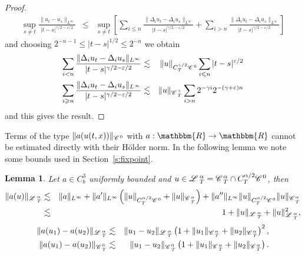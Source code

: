 \documentclass[11pt,reqno]{amsart}
\newtheorem{lemma}[theorem]{Lemma}
\newcommand{\CC}{\mathscr{C} \hspace{.1em}}
\newcommand{\LL}{\mathscr{L} \hspace{.2em}}
\begin{document}
\begin{proof}
  
  \begin{eqnarray*}
    \sup_{s \neq t} \frac{\| u_t - u_s \|_{L^{\infty}}}{| t - s |^{\gamma / 2
    - \varepsilon / 2}} & \leqslant & \sup_{s \neq t} \left[ \sum_{i \leqslant
    n} \frac{\| \Delta_i u_t - \Delta_i u_s \|_{L^{\infty}}}{| t - s |^{\gamma
    / 2 - \varepsilon / 2}} + \sum_{i > n} \frac{\| \Delta_i u_t - \Delta_i
    u_s \|_{L^{\infty}}}{| t - s |^{\gamma / 2 - \varepsilon / 2}} \right]
  \end{eqnarray*}
  and choosing $2^{- n - 1} \leqslant | t - s |^{1 / 2} \leqslant 2^{- n}$ we
  obtain
  \begin{eqnarray*}
    \sum_{i < n} \frac{\| \Delta_i u_t - \Delta_i u_s \|_{L^{\infty}}}{| t - s
    |^{\gamma / 2 - \varepsilon / 2}} & \lesssim & \| u \|_{C_T^{\gamma / 2}
    \CC^0} \sum_{i \leqslant n} | t - s |^{\varepsilon / 2}\\
    \sum_{i \geqslant n} \frac{\| \Delta_i u_t - \Delta_i u_s
    \|_{L^{\infty}}}{| t - s |^{\gamma / 2 - \varepsilon / 2}} & \lesssim & \|
    u \|_{\CC^{\gamma}_T} \sum_{i > n} 2^{- \gamma i} 2^{- (\gamma +
    \varepsilon) n}
  \end{eqnarray*}
  and this gives the result.
\end{proof}

Terms of the type $\| a (u (t, x)) \|_{\CC^0}$ with $a : \mathbbm{R}
\rightarrow \mathbbm{R}$ cannot be estimated directly with their H{\"o}lder
norm. In the following lemma we note some bounds used in
Section~\ref{s:fixpoint}.

\begin{lemma}
  Let $a \in C^3_b$ uniformly bounded and $u \in \LL^{\alpha}_T =
  \CC^{\alpha}_T \cap C_T^{\alpha / 2} \CC^0$, then
  \begin{eqnarray*}
    \| a (u) \|_{\LL^{\alpha}_T} & \lesssim & \| a \|_{L^{\infty}} + \| a'
    \|_{L^{\infty}} \left( \| u \|_{C_T^{\alpha / 2} \CC^0} + \| u
    \|_{\CC^{\alpha}_{_T}} \right) + \| a'' \|_{L^{\infty}} \| u
    \|_{C_T^{\alpha / 2} \CC^0} \| u \|_{\CC^{\alpha}_{_T}}\\
    & \lesssim & 1 + \| u \|_{\LL^{\alpha}_T} + \| u \|^2_{\LL_T^{\alpha}},
  \end{eqnarray*}
  \begin{eqnarray*}
    \| a (u_1) - a (u_2) \|_{\LL_T^{\alpha}} & \lesssim & \| u_1 - u_2
    \|_{\LL^{\alpha}_T} \left( 1 + \| u_1 \|_{\CC^{\alpha}_T} + \| u_2
    \|_{\CC^{\alpha}_T} \right)^2,\\
    \| a (u_1) - a (u_2) \|_{\CC_T^0} & \lesssim & \| u_1 - u_2 \|_{\CC^0_T}
    \left( 1 + \| u_1 \|_{\CC^{\alpha}_T} + \| u_2 \|_{\CC^{\alpha}_T} \right)
    .
  \end{eqnarray*}
\end{lemma}
\end{document}

